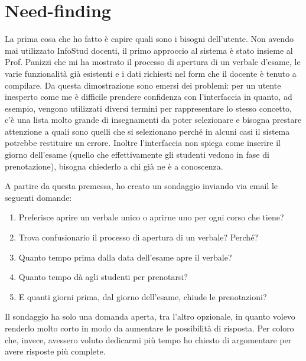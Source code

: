 \documentclass[Lau, oneside, noexaminfo]{sapthesis}%
\begin{document}
\section{Need-finding}
\label{sec:nf}
La prima cosa che ho fatto è capire quali sono i bisogni dell'utente. Non avendo mai utilizzato InfoStud docenti, il primo approccio al sistema è stato insieme al Prof. Panizzi che mi ha mostrato il processo di apertura di un verbale d'esame, le varie funzionalità già esistenti e i dati richiesti nel form che il docente è tenuto a compilare. Da questa dimostrazione sono emersi dei problemi: per un utente inesperto come me è difficile prendere confidenza con l'interfaccia in quanto, ad esempio, vengono utilizzati diversi termini per rappresentare lo stesso concetto, c'è una lista molto grande di insegnamenti da poter selezionare e bisogna prestare attenzione a quali sono quelli che si selezionano perché in alcuni casi il sistema potrebbe restituire un errore. Inoltre l'interfaccia non spiega come inserire il giorno dell'esame (quello che effettivamente gli studenti vedono in fase di prenotazione), bisogna chiederlo a chi già ne è a conoscenza.

A partire da questa premessa, ho creato un sondaggio inviando via email le seguenti domande:

\begin{enumerate}
	\item Preferisce aprire un verbale unico o aprirne uno per ogni corso che tiene? 
	\item Trova confusionario il processo di apertura di un verbale? Perché?
	\item Quanto tempo prima dalla data dell'esame apre il verbale?
	\item Quanto tempo dà agli studenti per prenotarsi?
	\item E quanti giorni prima, dal giorno dell'esame, chiude le prenotazioni? 
\end{enumerate}

Il sondaggio ha solo una domanda aperta, tra l'altro opzionale, in quanto volevo renderlo molto corto in modo da aumentare le possibilità di risposta. Per coloro che, invece, avessero voluto dedicarmi più tempo ho chiesto di argomentare per avere risposte più complete. 
\end{document}
